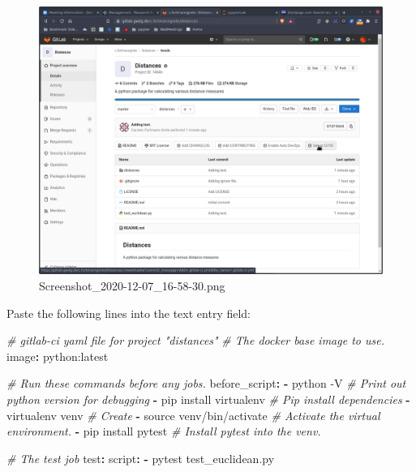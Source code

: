 \documentclass[11pt]{article}
\newenvironment{Shaded}{}{}
\newcommand{\KeywordTok}[1]{\textcolor[rgb]{0.00,0.44,0.13}{\textbf{{#1}}}}
\newcommand{\CommentTok}[1]{\textcolor[rgb]{0.38,0.63,0.69}{\textit{{#1}}}}
\newcommand{\FunctionTok}[1]{\textcolor[rgb]{0.02,0.16,0.49}{{#1}}}
\newcommand{\AttributeTok}[1]{\textcolor[rgb]{0.49,0.56,0.16}{{#1}}}
\begin{document}
\begin{figure}
\centering
\includegraphics{static/distance_project.png}
\caption{Screenshot\_2020-12-07\_16-58-30.png}
\end{figure}

    Paste the following lines into the text entry field:

\begin{Shaded}
\begin{Highlighting}[]
\CommentTok{\# gitlab{-}ci yaml file for project "distances"}
\CommentTok{\# The docker base image to use.}
\FunctionTok{image}\KeywordTok{:}\AttributeTok{ python:latest}

\CommentTok{\# Run these commands before any jobs.}
\FunctionTok{before\_script}\KeywordTok{:}
\AttributeTok{  }\KeywordTok{{-}}\AttributeTok{ python {-}V}\CommentTok{                 \# Print out python version for debugging}
\AttributeTok{  }\KeywordTok{{-}}\AttributeTok{ pip install virtualenv}\CommentTok{    \# Pip install dependencies}
\AttributeTok{  }\KeywordTok{{-}}\AttributeTok{ virtualenv venv}\CommentTok{           \# Create }
\AttributeTok{  }\KeywordTok{{-}}\AttributeTok{ source venv/bin/activate}\CommentTok{  \# Activate the virtual environment.}
\AttributeTok{  }\KeywordTok{{-}}\AttributeTok{ pip install pytest}\CommentTok{        \# Install pytest into the venv.}

\CommentTok{\# The test job }
\FunctionTok{test}\KeywordTok{:}
\AttributeTok{  }\FunctionTok{script}\KeywordTok{:}
\AttributeTok{    }\KeywordTok{{-}}\AttributeTok{ pytest test\_euclidean.py}
\end{Highlighting}
\end{Shaded}
\end{document}
